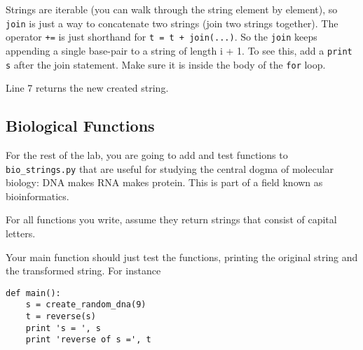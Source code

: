 \documentclass[12pt]{article}
\begin{document}
Strings are iterable (you can walk through the string element by element), so \texttt{join} is just a way to concatenate two strings (join two strings together). The operator \texttt{+=} is just shorthand for \texttt{t = t + join(...)}. So the \texttt{join} keeps appending a single base-pair to a string of length i + 1. To see this, add a \texttt{print s} after the join statement. Make sure it is inside the body of the \texttt{for} loop.

Line 7 returns the new created string.

\subsection*{Biological Functions}

For the rest of the lab, you are going to add and test functions to \texttt{bio\_strings.py} that are useful for studying the central dogma of molecular biology: DNA makes RNA makes protein. This is part of a field known as bioinformatics. 

For all functions you write, assume they return strings that consist of capital letters.

Your main function should just test the functions, printing the original string and the transformed string. For instance

\begin{verbatim}
def main():
    s = create_random_dna(9)
    t = reverse(s)
    print 's = ', s
    print 'reverse of s =', t
\end{verbatim}
\end{document}
